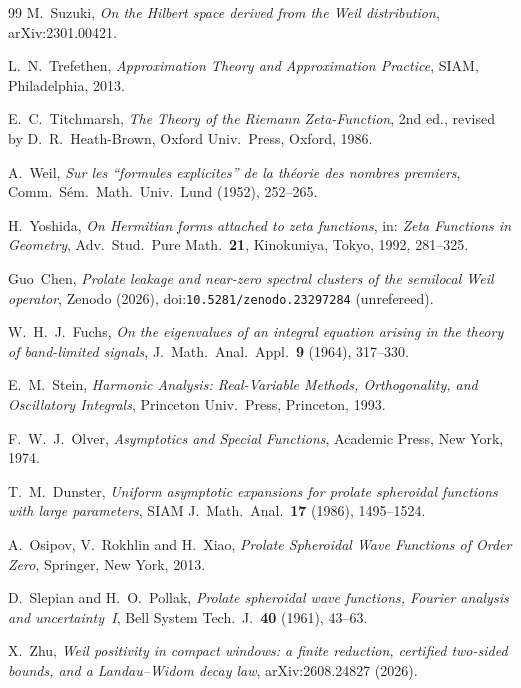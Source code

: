 \documentclass[11pt]{amsart}
\theoremstyle{definition}
\theoremstyle{remark}
\begin{document}
\begin{thebibliography}{99}
 M.~Suzuki, \emph{On the Hilbert space derived from the Weil
distribution}, arXiv:2301.00421.

 L.~N.~Trefethen, \emph{Approximation Theory and Approximation Practice},
SIAM, Philadelphia, 2013.

 E.~C.~Titchmarsh, \emph{The Theory of the Riemann Zeta-Function}, 2nd ed., revised by D.~R.~Heath-Brown,
Oxford Univ.\ Press, Oxford, 1986.

 A.~Weil, \emph{Sur les ``formules explicites'' de la th\'eorie des nombres
premiers}, Comm.~S\'em.~Math.~Univ.~Lund (1952), 252--265.

 H.~Yoshida, \emph{On Hermitian forms attached to zeta functions}, in:
\emph{Zeta Functions in Geometry}, Adv.~Stud.~Pure Math.~\textbf{21}, Kinokuniya, Tokyo, 1992, 281--325.

 Guo~Chen, \emph{Prolate leakage and near-zero spectral clusters of the semilocal Weil operator},
Zenodo (2026), doi:\nolinkurl{10.5281/zenodo.23297284} (unrefereed).

 W.~H.~J.~Fuchs, \emph{On the eigenvalues of an integral equation arising in the theory of band-limited
signals}, J.\ Math.\ Anal.\ Appl.\ \textbf{9} (1964), 317--330.

 E.~M.~Stein, \emph{Harmonic Analysis: Real-Variable Methods, Orthogonality, and Oscillatory Integrals},
Princeton Univ.~Press, Princeton, 1993.

 F.~W.~J.~Olver, \emph{Asymptotics and Special Functions}, Academic Press, New York, 1974.

 T.~M.~Dunster, \emph{Uniform asymptotic expansions for prolate spheroidal functions with large
parameters}, SIAM J.\ Math.\ Anal.\ \textbf{17} (1986), 1495--1524.

 A.~Osipov, V.~Rokhlin and H.~Xiao, \emph{Prolate Spheroidal Wave Functions of Order Zero},
Springer, New York, 2013.

 D.~Slepian and H.~O.~Pollak, \emph{Prolate spheroidal wave functions, Fourier analysis and
uncertainty~I}, Bell System Tech.\ J.\ \textbf{40} (1961), 43--63.

 X.~Zhu, \emph{Weil positivity in compact windows: a finite reduction, certified
two-sided bounds, and a Landau--Widom decay law}, arXiv:2608.24827 (2026).

\end{thebibliography}
\end{document}
